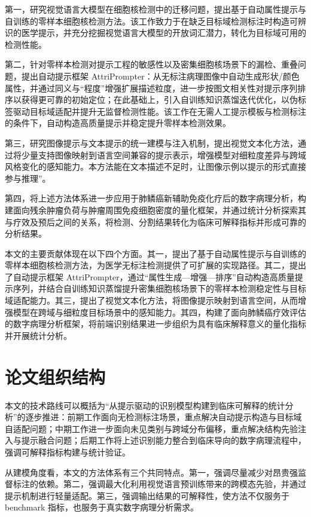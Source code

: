 第一，研究视觉语言大模型在细胞核检测中的迁移问题，提出基于自动属性提示与自训练的零样本细胞核检测方法。该工作致力于在缺乏目标域检测标注时构造可辨识的医学提示，并充分挖掘视觉语言大模型的开放词汇潜力，转化为目标域可用的检测性能。

第二，针对零样本检测对提示工程的敏感性以及密集细胞核场景下的漏检、重叠问题，提出自动提示框架 AttriPrompter：从无标注病理图像中自动生成形状/颜色属性，并通过同义与“程度”增强扩展描述粒度，进一步按图文相关性对提示序列排序以获得更可靠的初始定位；在此基础上，引入自训练知识蒸馏迭代优化，以伪标签驱动目标域适配并提升无监督检测性能。该工作在无需人工提示模板与检测标注的条件下，自动构造高质量提示并稳定提升零样本检测效果。

第三，研究图像提示与文本提示的统一建模与注入机制，提出视觉文本化方法，通过将少量支持图像映射到语言空间兼容的提示表示，增强模型对细粒度差异与跨域风格变化的感知能力。本方法能在文本描述不足时，让图像示例以提示的形式直接参与推理”。

第四，将上述方法体系进一步应用于肺鳞癌新辅助免疫化疗后的数字病理分析，构建面向残余肿瘤负荷与肿瘤周围免疫细胞密度的量化框架，并通过统计分析探索其与疗效及预后之间的关系，将检测、分割结果转化为临床可解释指标并形成可靠的分析结果。

本文的主要贡献体现在以下四个方面。其一，提出了基于自动属性提示与自训练的零样本细胞核检测方法，为医学无标注检测提供了可扩展的实现路径。其二，提出了自动提示框架 AttriPrompter，通过“属性生成—增强—排序”自动构造高质量提示序列，并结合自训练知识蒸馏提升密集细胞核场景下的零样本检测稳定性与目标域适配能力。其三，提出了视觉文本化方法，将图像提示映射到语言空间，从而增强模型在跨域与细粒度目标场景中的感知能力。其四，构建了面向肺鳞癌疗效评估的数字病理分析框架，将前端识别结果进一步组织为具有临床解释意义的量化指标并开展统计分析。




\section{论文组织结构}
本文的技术路线可以概括为“从提示驱动的识别模型构建到临床可解释的统计分析”的逐步推进：前期工作面向无检测标注场景，重点解决自动提示构造与目标域自适配问题；中期工作进一步面向未见类别与跨域分布偏移，重点解决结构先验注入与提示融合问题；后期工作将上述识别能力整合到临床导向的数字病理流程中，强调可解释指标构建与统计验证。

从建模角度看，本文的方法体系有三个共同特点。第一，强调尽量减少对昂贵强监督标注的依赖。第二，强调最大化利用视觉语言预训练带来的跨模态先验，并通过提示机制进行轻量适配。第三，强调输出结果的可解释性，使方法不仅服务于 benchmark 指标，也服务于真实数字病理分析需求。



